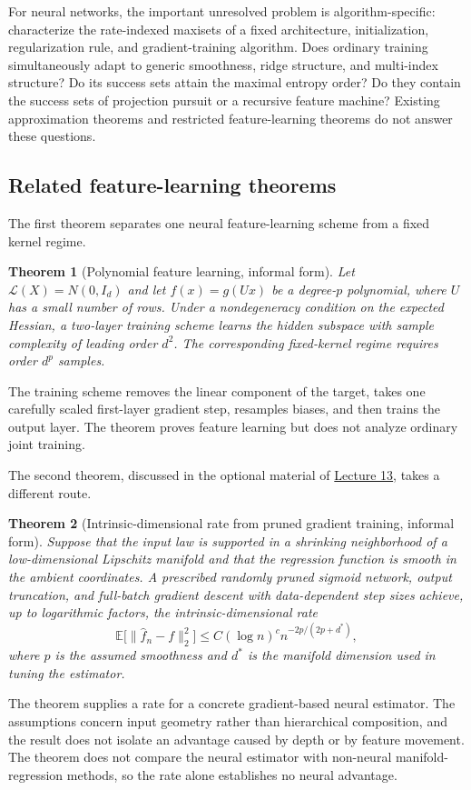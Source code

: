 \documentclass[11pt,twoside]{article}
\newcommand{\E}{\mathbb E}
\newcommand{\Law}{\mathcal L}
\newtheorem{theorem}{Theorem}[section]
\theoremstyle{definition}
\theoremstyle{remark}
\begin{document}
For neural networks, the important unresolved problem is algorithm-specific:
characterize the rate-indexed maxisets of a fixed architecture,
initialization, regularization rule, and gradient-training algorithm. Does
ordinary training simultaneously adapt to generic smoothness, ridge
structure, and multi-index structure? Do its success sets attain the maximal
entropy order? Do they contain the success sets of projection pursuit or a
recursive feature machine? Existing approximation theorems and restricted
feature-learning theorems do not answer these questions.

\subsection{Related feature-learning theorems}

The first theorem separates one neural feature-learning scheme from a fixed
kernel regime.
\begin{theorem}[Polynomial feature learning, informal form]
Let $\Law(X)=N(0,I_d)$ and let $f(x)=g(Ux)$ be a degree-$p$ polynomial, where
$U$ has a small number of rows. Under a nondegeneracy condition on the
expected Hessian, a two-layer training scheme learns the hidden subspace with
sample complexity of leading order $d^2$. The corresponding fixed-kernel
regime requires order $d^p$ samples.
\end{theorem}
The training scheme removes the linear component of the target, takes one
carefully scaled first-layer gradient step, resamples biases, and then trains
the output layer. The theorem proves feature learning but does not analyze
ordinary joint training.

The second theorem, discussed in the optional material of
\href{lecture13.pdf}{Lecture 13}, takes a different route.
\begin{theorem}[Intrinsic-dimensional rate from pruned gradient training, informal form]
Suppose that the input law is supported in a shrinking neighborhood of a
low-dimensional Lipschitz manifold and that the regression function is smooth
in the ambient coordinates. A prescribed randomly pruned sigmoid network,
output truncation, and full-batch gradient descent with data-dependent step
sizes achieve, up to logarithmic factors, the intrinsic-dimensional rate
\begin{equation}
 \E\bigl[\|\widehat f_n-f\|_2^2\bigr]
 \leq C(\log n)^c n^{-2p/(2p+d^*)},
 \label{eq:kohler-manifold-rate}
\end{equation}
where $p$ is the assumed smoothness and $d^*$ is the manifold dimension used
in tuning the estimator.
\end{theorem}
The theorem supplies a rate for a concrete gradient-based neural estimator.
The assumptions concern input geometry rather than hierarchical composition,
and the result does not isolate an advantage caused by depth or by feature
movement. The theorem does not compare the neural estimator with non-neural
manifold-regression methods, so the rate alone establishes no neural advantage.
\end{document}
